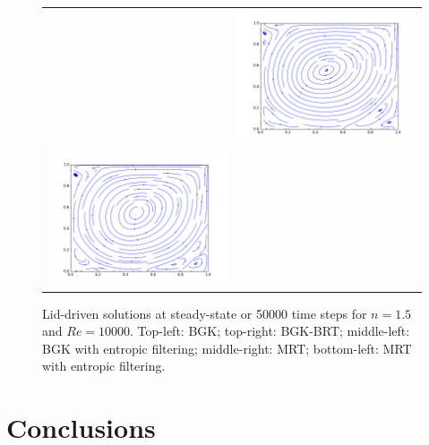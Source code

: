 \begin{figure}
\begin{tabulary}{\linewidth}{c c}
		&
		\includegraphics[width=\figwid]{figs/lid/power_mrt_100_n1.5_Re10000/sl_step-000050000}
		\\
		\includegraphics[width=\figwid]{figs/lid/power_mrt-filter_100_n1.5_Re10000/sl_step-000050000}
	\end{tabulary}
	\caption{Lid-driven solutions at steady-state or 50000 time steps for $n = 1.5$ and $Re = 10000$. Top-left: BGK; top-right: BGK-BRT; middle-left: BGK with entropic filtering; middle-right: MRT; bottom-left: MRT with entropic filtering.}
	\label{fig:lid-n15-Re10000}
\end{figure}

\section{Conclusions} \label{sec:numerical-study-conclusions}

